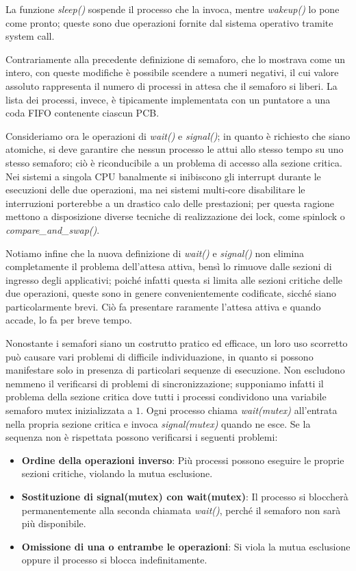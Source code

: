 \noindent La funzione \textit{sleep()} sospende il processo che la invoca, mentre \textit{wakeup()} lo pone come pronto; queste sono due operazioni
fornite dal sistema operativo tramite system call.\par
Contrariamente alla precedente definizione di semaforo, che lo mostrava come un intero, con queste modifiche è possibile scendere a numeri negativi, il
cui valore assoluto rappresenta il numero di processi in attesa che il semaforo si liberi. La lista dei processi, invece, è tipicamente implementata
con un puntatore a una coda FIFO contenente ciascun PCB.\par
Consideriamo ora le operazioni di \textit{wait()} e \textit{signal()}; in quanto è richiesto che siano atomiche, si deve garantire che nessun processo
le attui allo stesso tempo su uno stesso semaforo; ciò è riconducibile a un problema di accesso alla sezione critica. Nei sistemi a singola CPU
banalmente si inibiscono gli interrupt durante le esecuzioni delle due operazioni, ma nei sistemi multi-core disabilitare le interruzioni porterebbe a
un drastico calo delle prestazioni; per questa ragione mettono a disposizione diverse tecniche di realizzazione dei lock, come spinlock o
\textit{compare\_and\_swap()}.\par
Notiamo infine che la nuova definizione di \textit{wait()} e \textit{signal()} non elimina completamente il problema dell'attesa attiva, bensì lo
rimuove dalle sezioni di ingresso degli applicativi; poiché infatti questa si limita alle sezioni critiche delle due operazioni, queste sono in genere
convenientemente codificate, sicché siano particolarmente brevi. Ciò fa presentare raramente l'attesa attiva e quando accade, lo fa per breve
tempo.\newline 

\noindent Nonostante i semafori siano un costrutto pratico ed efficace, un loro uso scorretto può causare vari problemi di difficile individuazione,
in quanto si possono manifestare solo in presenza di particolari sequenze di esecuzione. Non escludono nemmeno il verificarsi di problemi di
sincronizzazione; supponiamo infatti il problema della sezione critica dove tutti i processi condividono una variabile semaforo mutex inizializzata a
$1$. Ogni processo chiama \textit{wait(mutex)} all'entrata nella propria sezione critica e invoca \textit{signal(mutex)} quando ne esce. Se la sequenza
non è rispettata possono verificarsi i seguenti problemi: \begin{itemize}
    \item \textbf{Ordine della operazioni inverso}: Più processi possono eseguire le proprie sezioni critiche, violando la mutua esclusione.
    \item \textbf{Sostituzione di signal(mutex) con wait(mutex)}: Il processo si bloccherà permanentemente alla seconda chiamata \textit{wait()},
    perché il semaforo non sarà più disponibile.
    \item \textbf{Omissione di una o entrambe le operazioni}: Si viola la mutua esclusione oppure il processo si blocca indefinitamente.
\end{itemize}

